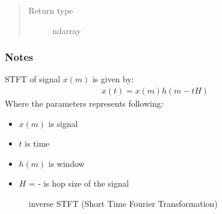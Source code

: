 \documentclass[letterpaper,10pt,english,openany,oneside]{sphinxmanual}
\begin{document}
\begin{fulllineitems}
\begin{fulllineitems}
\begin{quote}
\begin{description}
\item[{Return type}] \leavevmode
ndarray

\end{description}\end{quote}
\subsubsection*{Notes}

STFT of signal \(x(m)\) is given by:
\begin{equation*}
\begin{split}x(t) = x(m)h(m - tH)\end{split}
\end{equation*}
Where the parameters represents following:
\begin{itemize}
\item {} 
\(x(m)\) is signal

\item {} 
\(t\) is time

\item {} 
\(h(m)\) is window

\item {} 
\(H\) =  -  is hop size of the signal

\end{itemize}



\begin{description}
\item[{{\hyperref[\detokenize{docs/source/preprocess:preprocess.preprocess_tools.STFT.istft}]{}}}] \leavevmode
inverse STFT (Short Time Fourier Transformation)

\end{description}



\end{fulllineitems}


\end{fulllineitems}

\end{document}
